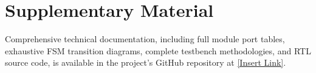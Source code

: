 \documentclass[11pt,a4paper,oneside]{report}
\begin{document}


\tableofcontents
\clearpage

\listoffigures
\clearpage

\listoftables
\clearpage











\chapter*{Supplementary Material}

Comprehensive technical documentation, including full module port tables,
exhaustive FSM transition diagrams, complete testbench methodologies, and
RTL source code, is available in the project's GitHub repository at
\href{https://github.com/}{[Insert Link]}.

\printbibliography[heading=bibintoc,title={References}]
\end{document}
